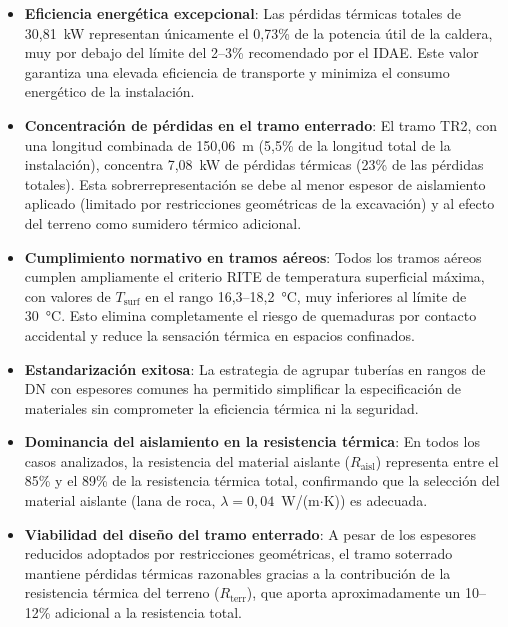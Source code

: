 \begin{itemize}[noitemsep]
	\item \textbf{Eficiencia energética excepcional}: Las pérdidas térmicas totales de 30{,}81~kW representan únicamente el 0{,}73\% de la potencia útil de la caldera, muy por debajo del límite del 2--3\% recomendado por el IDAE. Este valor garantiza una elevada eficiencia de transporte y minimiza el consumo energético de la instalación.

	\item \textbf{Concentración de pérdidas en el tramo enterrado}: El tramo TR2, con una longitud combinada de 150{,}06~m (5{,}5\% de la longitud total de la instalación), concentra 7{,}08~kW de pérdidas térmicas (23\% de las pérdidas totales). Esta sobrerrepresentación se debe al menor espesor de aislamiento aplicado (limitado por restricciones geométricas de la excavación) y al efecto del terreno como sumidero térmico adicional.

	\item \textbf{Cumplimiento normativo en tramos aéreos}: Todos los tramos aéreos cumplen ampliamente el criterio RITE de temperatura superficial máxima, con valores de $T_{\text{surf}}$ en el rango 16{,}3--18{,}2~°C, muy inferiores al límite de 30~°C. Esto elimina completamente el riesgo de quemaduras por contacto accidental y reduce la sensación térmica en espacios confinados.

	\item \textbf{Estandarización exitosa}: La estrategia de agrupar tuberías en rangos de DN con espesores comunes ha permitido simplificar la especificación de materiales sin comprometer la eficiencia térmica ni la seguridad.

	\item \textbf{Dominancia del aislamiento en la resistencia térmica}: En todos los casos analizados, la resistencia del material aislante ($R_{\text{aisl}}$) representa entre el 85\% y el 89\% de la resistencia térmica total, confirmando que la selección del material aislante (lana de roca, $\lambda = 0{,}04$~W/(m$\cdot$K)) es adecuada.

	\item \textbf{Viabilidad del diseño del tramo enterrado}: A pesar de los espesores reducidos adoptados por restricciones geométricas, el tramo soterrado mantiene pérdidas térmicas razonables gracias a la contribución de la resistencia térmica del terreno ($R_{\text{terr}}$), que aporta aproximadamente un 10--12\% adicional a la resistencia total.
\end{itemize}

